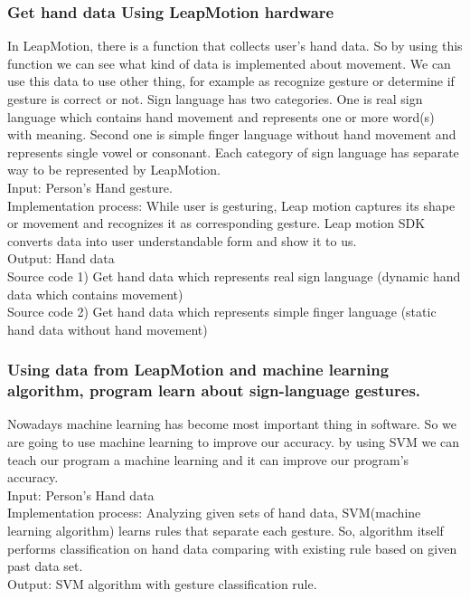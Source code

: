 \documentclass[10pt,journal,compsoc]{IEEEtran}
\begin{document}
\subsubsection{Get hand data Using LeapMotion hardware\\}
In LeapMotion, there is a function that collects user’s hand data. So by using this function we can see what kind of data is implemented about movement. We can use this data to use other thing, for example as recognize gesture or determine if gesture is correct or not.
Sign language has two categories. One is real sign language which contains hand movement and represents one or more word(s) with meaning. Second one is simple finger language without hand movement and represents single vowel or consonant. Each category of sign language has separate way to be represented by LeapMotion.
\\Input: Person's Hand gesture.
\\Implementation process: While user is gesturing, Leap motion captures its shape or movement and recognizes it as corresponding gesture. Leap motion SDK converts data into user understandable form and show it to us.
\\Output: Hand data
\\Source code 1) Get hand data which represents real sign language (dynamic hand data which contains movement)\\
Source code 2) Get hand data which represents simple finger language (static hand data without hand movement)\\



\subsubsection {Using data from LeapMotion and machine learning algorithm, program learn about sign-language gestures.\\}
Nowadays machine learning has become most important thing in software. So we are going to use machine learning to improve our accuracy. by using SVM we can teach our program a machine learning and it can improve our program’s accuracy.
\\Input: Person's Hand data
\\Implementation process: Analyzing given sets of hand data, SVM(machine learning algorithm) learns rules that separate each gesture. So, algorithm itself performs classification on hand data comparing with existing rule based on given past data set.
\\Output: SVM algorithm with gesture classification rule.
\end{document}
